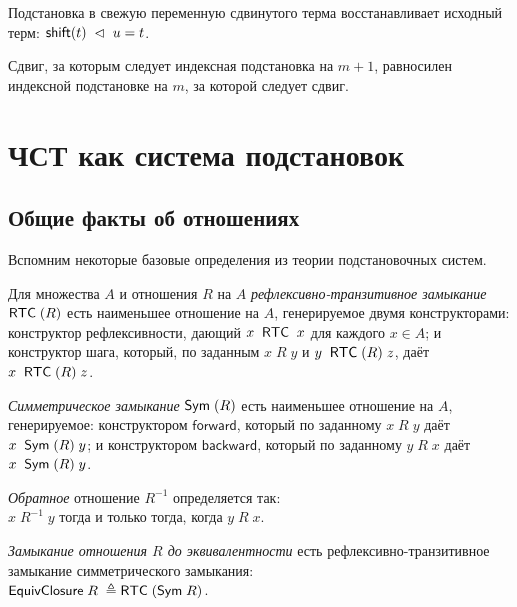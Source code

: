 \begin{lemma}
Подстановка в свежую переменную сдвинутого терма
восстанавливает исходный терм:
$\mathsf{shift}(t)\;\vartriangleleft\;u = t$.
\end{lemma}

\begin{lemma}
Сдвиг, за которым следует индексная подстановка на
$m+1$, равносилен индексной подстановке на $m$, за
которой следует сдвиг.
\end{lemma}

\section{ЧСТ как система подстановок}

\subsection{Общие факты об отношениях}

Вспомним некоторые базовые определения из теории
подстановочных систем.

\begin{definition}
Для множества $A$ и отношения $R$ на $A$
\emph{рефлексивно-транзитивное замыкание} $\mathrel{\mathsf{RTC}}(R)$
есть наименьшее отношение на $A$, генерируемое двумя
конструкторами: конструктор рефлексивности, дающий
$x\;\mathrel{\mathsf{RTC}}\;x$ для каждого $x \in A$; и конструктор шага,
который, по заданным $x\;R\;y$ и $y\;\mathrel{\mathsf{RTC}}(R)\;z$, даёт
$x\;\mathrel{\mathsf{RTC}}(R)\;z$.
\end{definition}

\begin{definition}
\emph{Симметрическое замыкание} $\mathrel{\mathsf{Sym}}(R)$ есть
наименьшее отношение на $A$, генерируемое:
конструктором $\mathsf{forward}$, который по заданному
$x\;R\;y$ даёт $x\;\mathrel{\mathsf{Sym}}(R)\;y$; и конструктором
$\mathsf{backward}$, который по заданному $y\;R\;x$
даёт $x\;\mathrel{\mathsf{Sym}}(R)\;y$.
\end{definition}

\begin{definition}
\emph{Обратное} отношение $R^{-1}$ определяется так: \\
$x\;R^{-1}\;y$ тогда и только тогда, когда $y\;R\;x$.
\end{definition}

\begin{definition}
\emph{Замыкание отношения $R$ до эквивалентности} есть 
рефлексивно-транзитивное замыкание симметрического
замыкания:\\
$\mathrel{\mathsf{EquivClosure}} R \;\triangleq\; \mathrel{\mathsf{RTC}}(\mathrel{\mathsf{Sym}} R)$.
\end{definition}

